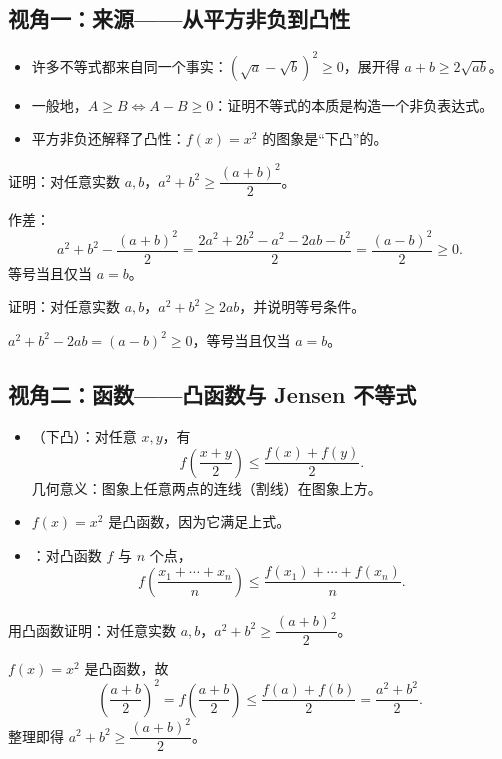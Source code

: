 \begin{explore}
\subsection{视角一：来源——从平方非负到凸性}

\begin{itemize}
  \item 许多不等式都来自同一个事实：$(\sqrt a-\sqrt b)^2\geq0$，展开得 $a+b\geq2\sqrt{ab}$。
  \item 一般地，$A\geq B\iff A-B\geq0$：证明不等式的本质是构造一个非负表达式。
  \item 平方非负还解释了凸性：$f(x)=x^2$ 的图象是“下凸”的。
\end{itemize}

\begin{example}
证明：对任意实数 $a,b$，$a^2+b^2\geq\dfrac{(a+b)^2}{2}$。
\end{example}
\begin{solution}
作差：
\[
  a^2+b^2-\frac{(a+b)^2}{2}
  =\frac{2a^2+2b^2-a^2-2ab-b^2}{2}
  =\frac{(a-b)^2}{2}\geq0.
\]
等号当且仅当 $a=b$。
\end{solution}

\begin{problem}
证明：对任意实数 $a,b$，$a^2+b^2\geq2ab$，并说明等号条件。
\end{problem}
\begin{solution}
$a^2+b^2-2ab=(a-b)^2\geq0$，等号当且仅当 $a=b$。
\end{solution}

\subsection{视角二：函数——凸函数与 Jensen 不等式}

\begin{itemize}
  \item {}（下凸）：对任意 $x,y$，有
  \[
    f\left(\frac{x+y}{2}\right)\leq\frac{f(x)+f(y)}{2}.
  \]
  几何意义：图象上任意两点的连线（割线）在图象上方。
  \item $f(x)=x^2$ 是凸函数，因为它满足上式。
  \item {}：对凸函数 $f$ 与 $n$ 个点，
  \[
    f\left(\frac{x_1+\cdots+x_n}{n}\right)\leq\frac{f(x_1)+\cdots+f(x_n)}{n}.
  \]
\end{itemize}

\begin{example}
用凸函数证明：对任意实数 $a,b$，$a^2+b^2\geq\dfrac{(a+b)^2}{2}$。
\end{example}
\begin{solution}
$f(x)=x^2$ 是凸函数，故
\[
  \left(\frac{a+b}{2}\right)^2=f\left(\frac{a+b}{2}\right)\leq\frac{f(a)+f(b)}{2}=\frac{a^2+b^2}{2}.
\]
整理即得 $a^2+b^2\geq\dfrac{(a+b)^2}{2}$。
\end{solution}


\end{explore}
